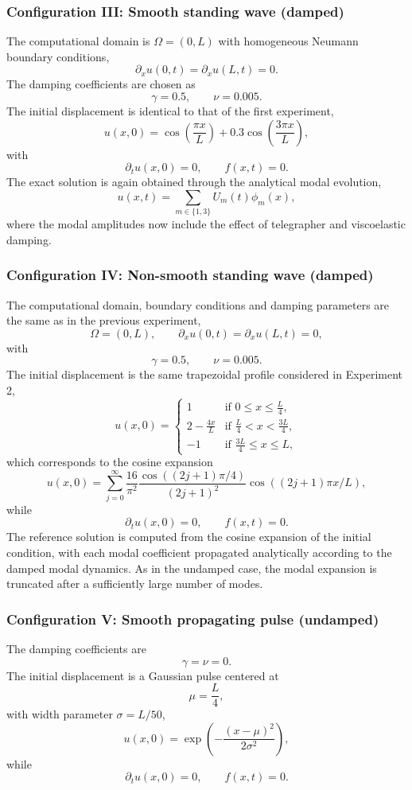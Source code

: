 \documentclass{Configuration_Files/PoliMi3i_thesis}
\begin{document}
\subsubsection{Configuration III: Smooth standing wave (damped)}
The computational domain is $\Omega=(0,L)$ with homogeneous Neumann boundary conditions,
\[
\partial_xu(0,t)=\partial_xu(L,t)=0.
\]
The damping coefficients are chosen as
\[
\gamma=0.5,
\qquad
\nu=0.005.
\]
The initial displacement is identical to that of the first experiment,
\[
u(x,0)
=
\cos\!\left(\frac{\pi x}{L}\right)
+
0.3\cos\!\left(\frac{3\pi x}{L}\right),
\]
with
\[
\partial_tu(x,0)=0,
\qquad
f(x,t)=0.
\]
The exact solution is again obtained through the analytical modal evolution,
\[
u(x,t)
=
\sum_{m\in\{1,3\}}
U_m(t)\phi_m(x),
\]
where the modal amplitudes now include the effect of telegrapher and viscoelastic damping.

\subsubsection{Configuration IV: Non-smooth standing wave (damped)}
The computational domain, boundary conditions and damping parameters are the same as in the previous experiment,
\[
\Omega=(0,L),\qquad
\partial_xu(0,t)=\partial_xu(L,t)=0,
\]
with
\[
\gamma=0.5,
\qquad
\nu=0.005.
\]
The initial displacement is the same trapezoidal profile considered in Experiment 2,
\[
u(x,0) = 
\begin{cases}
1 & \text{if } 0 \le x \le \frac{L}{4}, \\[4pt]
2 - \frac{4x}{L} & \text{if } \frac{L}{4} < x < \frac{3L}{4}, \\[4pt]
-1 & \text{if } \frac{3L}{4} \le x \le L,
\end{cases}
\]
which corresponds to the cosine expansion
\[
u(x,0)
=
\sum_{j=0}^{\infty}
\frac{16}{\pi^2} \frac{\cos\left((2j+1)\pi/4\right)}{(2j+1)^2}
\cos\left((2j+1)\pi x/L\right),
\]
while
\[
\partial_tu(x,0)=0,
\qquad
f(x,t)=0.
\]
The reference solution is computed from the cosine expansion of the initial condition, with each modal coefficient propagated analytically according to the damped modal dynamics. As in the undamped case, the modal expansion is truncated after a sufficiently large number of modes.

\subsubsection{Configuration V: Smooth propagating pulse (undamped)}
The damping coefficients are
\[
\gamma=\nu=0.
\]
The initial displacement is a Gaussian pulse centered at
\[
\mu=\frac{L}{4},
\]
with width parameter $\sigma=L/50$,
\[
u(x,0)
=
\exp\!\left(
-\frac{(x-\mu)^2}{2\sigma^2}
\right),
\]
while
\[
\partial_tu(x,0)=0,
\qquad
f(x,t)=0.
\]
\end{document}
